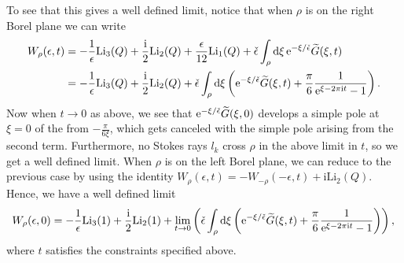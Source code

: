 \documentclass[pdftex]{sigma}
\numberwithin{equation}{section}
\begin{document}
To see that this gives a well defined limit, notice that when $\rho$ is on the right Borel plane we can write
\begin{align*}
 W_{\rho}(\epsilon,t)&=-\frac{1}{\epsilon} \mathrm{Li}_{3}(Q)+ \frac{\mathrm{i}}{2}\mathrm{Li}_{2}(Q)+\frac{\epsilon}{12}\mathrm{Li_1}(Q) + \check{\epsilon}\int_{\rho}\mathrm{d}\xi\, {\rm e}^{-\xi/\check{\epsilon}}\widetilde{G}(\xi,t)\\
 &=-\frac{1}{\epsilon} \mathrm{Li}_{3}(Q)+ \frac{\mathrm{i}}{2}\mathrm{Li}_{2}(Q) +\check{\epsilon}\int_{\rho}\mathrm{d}\xi \left({\rm e}^{-\xi/\check{\epsilon}}\widetilde{G}(\xi,t)+\frac{\pi}{6}\frac{1}{{\rm e}^{\xi-2\pi {\rm i}t}-1}\right).
 \end{align*}
Now when $t\to 0$ as above, we see that ${\rm e}^{-\xi/\check\epsilon}\widetilde{G}(\xi,0)$ develops a simple pole at $\xi=0$ of the from $-\frac{\pi}{6\xi}$, which gets canceled with the simple pole arising from the second term. Furthermore, no Stokes rays $l_k$ cross $\rho$ in the above limit in $t$, so we get a well defined limit. When $\rho$ is on the left Borel plane, we can reduce to the previous case by using the identity $W_{\rho}(\epsilon,t)=-W_{-\rho}(-\epsilon,t)+\mathrm{i}\mathrm{Li}_2(Q)$. Hence, we have a well defined limit
\begin{equation*}
 W_{\rho}(\epsilon,0)=-\frac{1}{\epsilon} \mathrm{Li}_{3}(1)+ \frac{\mathrm{i}}{2}\mathrm{Li}_{2}(1) +\lim_{t\to 0}\left(\check{\epsilon}\int_{\rho}\mathrm{d}\xi \left({\rm e}^{-\xi/\check{\epsilon}}\widetilde{G}(\xi,t)+\frac{\pi}{6}\frac{1}{{\rm e}^{\xi-2\pi \mathrm{i} t}-1}\right)\right),\\
\end{equation*}
where $t$ satisfies the constraints specified above.
\end{document}
